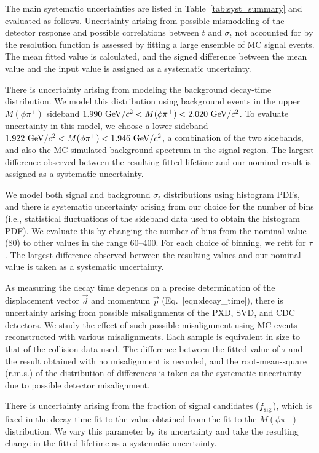 \documentclass[aps,prl,twocolumn,superscriptaddress,showpacs,preprintnumbers,amsmath,amssymb]{revtex4-2}
\def\sigmat{\sigma^{}_t}
\def\trec {t}
\begin{document}
The main systematic uncertainties are listed in 
Table~\ref{tab:syst_summary} and evaluated as follows.
Uncertainty arising
from possible mismodeling of the detector response and 
possible correlations between $\trec$ and $\sigmat$ not 
accounted for by the resolution function is assessed
by fitting a large ensemble of MC signal events. 
The mean fitted value is calculated, and the signed
difference between the mean value and the input value
is assigned as a systematic uncertainty.

There is uncertainty arising from modeling the background decay-time distribution.
We model this distribution using background events in the upper $M(\phi\pi^+)$ sideband 
$1.990~{\rm GeV}/c^2 < M(\phi\pi^+) <2.020~{\rm GeV}/c^2$. To evaluate uncertainty in this model,
we choose a lower sideband $1.922~{\rm GeV}/c^2 < M(\phi\pi^+) <1.946~{\rm GeV}/c^2$, a 
combination of the two sidebands, and also the MC-simulated background spectrum in 
the signal region.
The largest difference observed between the resulting fitted lifetime and our 
nominal result is assigned as a systematic uncertainty. 

We model both signal and background $\sigmat$ distributions using histogram PDFs, 
and there is systematic uncertainty arising from our choice for the number of bins
(i.e., statistical fluctuations of the sideband data used to obtain the histogram PDF).
We evaluate this by changing the number of bins from the nominal value (80) to 
other values in the range 60--400. For each choice of binning, we refit 
for $\tau$. The largest difference observed between the resulting values and 
our nominal value is taken as a systematic uncertainty. 

As measuring the decay time depends on a precise determination of the
displacement vector $\vec{d}$ and momentum $\vec{p}$ (Eq.~\ref{eqn:decay_time}), 
there is uncertainty arising from possible misalignments of the PXD, SVD, and 
CDC detectors. We study the effect of such possible misalignment using MC events 
reconstructed with various misalignments. Each sample is equivalent in size to that 
of the collision data used. The difference between the fitted value of $\tau$ and 
the result obtained with no misalignment is recorded, and the root-mean-square (r.m.s.) 
of the distribution of differences is taken as the systematic uncertainty due to 
possible detector misalignment. 

There is uncertainty arising from the fraction of signal candidates ($f^{}_{\rm sig}$),
which is fixed in the decay-time fit to the value obtained
from the fit to the $M(\phi\pi^+)$ distribution. We vary this parameter by 
its uncertainty and take the resulting change in the fitted lifetime as a 
systematic uncertainty. 
\end{document}
